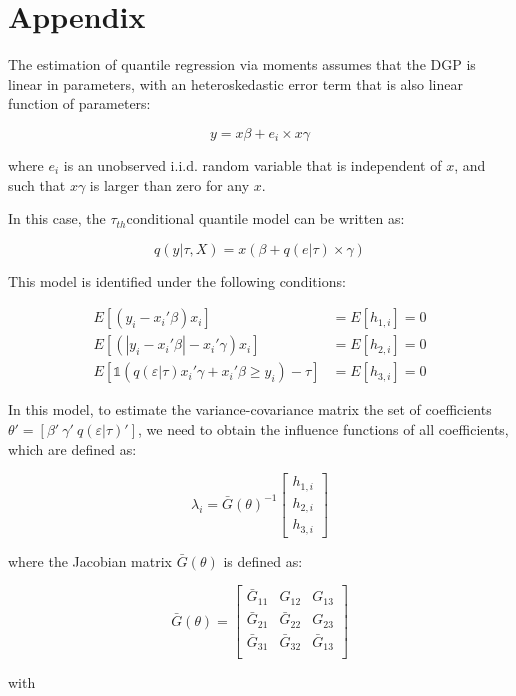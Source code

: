 \documentclass[
  letterpaper,
  DIV=11,
  numbers=noendperiod]{scrartcl}
\begin{document}
\hypertarget{appendix}{%
\section{Appendix}\label{appendix}}

The estimation of quantile regression via moments assumes that the DGP
is linear in parameters, with an heteroskedastic error term that is also
linear function of parameters:

\[y = x\beta + e_i \times x\gamma\]

where \(e_i\) is an unobserved i.i.d. random variable that is
independent of \(x\), and such that \(x\gamma\) is larger than zero for
any \(x\).

In this case, the \(\tau_{th}\)conditional quantile model can be written
as:

\[q(y|\tau,X) = x(\beta + q(e|\tau) \times \gamma)\]

This model is identified under the following conditions:

\[\begin{aligned}
  E[(y_i-x_i'\beta)x_i ]  &= E[h_{1,i}]=0 \\
  E[ (|y_i-x_i'\beta|-x_i' \gamma) x_i ] &=E[h_{2,i}]=0 \\
  E\left[  \mathbb{1}\left( q(\varepsilon|\tau) x_i'\gamma +x_i'\beta\geq  y_i  \right) - \tau \right] 
   &=E[h_{3,i}]=0 
\end{aligned}
\]

In this model, to estimate the variance-covariance matrix the set of
coefficients \(\theta'=[\beta' \ \gamma' \ q(\varepsilon|\tau)']\), we
need to obtain the influence functions of all coefficients, which are
defined as:

\[\lambda_i = \bar G(\theta)^{-1}
\begin{bmatrix}
h_{1,i} \\
h_{2,i} \\
h_{3,i}
\end{bmatrix}
\]

where the Jacobian matrix \(\bar G(\theta)\) is defined as:

\[\bar G(\theta) = \begin{bmatrix}
\bar G_{11} & G_{12} & G_{13} \\
\bar G_{21} & \bar G_{22} & G_{23} \\
\bar G_{31} & \bar G_{32} & \bar G_{13} \\
\end{bmatrix}
\]

with
\end{document}
